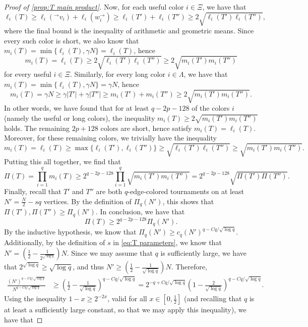 \documentclass[11pt,reqno]{amsart}
\theoremstyle{definition}
\newcommand\ab[1]{\lvert#1\rvert}
\newcommand\1{\mathbf{1}}
\let\geq\geqslant
\begin{document}
\begin{proof}[Proof of \cref{prop:T main product}]
    Now, for each useful color $i \in \Xi$, we have that
    \[
        \ell_i(T) \geq \ell_i(^\to v_i)+\ell_i(w_i^\to) \geq \ell_i(T')+\ell_i(T'') \geq 2\sqrt{\ell_i(T') \ell_i(T'')},
    \]
    where the final bound is the inequality of arithmetic and geometric means. Since every such color is short, we also know that $m_i(T)=\min\{\ell_i(T),\gamma N\}=\ell_i(T)$, hence
    \[
        m_i(T)=\ell_i(T)\geq 2 \sqrt{\ell_i(T')\ell_i(T'')}\geq 2\sqrt{m_i(T')m_i(T'')}
    \]
    for every useful $i \in \Xi$.
    Similarly, for every long color $i \in \Lambda$, we have that $m_i(T)=\min\{\ell_i(T),\gamma N\}=\gamma N$, hence
    \[
        m_i(T) = \gamma N \geq \gamma \ab{T'}+\gamma \ab{T''} \geq m_i(T')+m_i(T'') \geq 2\sqrt{m_i(T')m_i(T'')}.
    \]
    In other words, we have found that for at least $q-2p-128$ of the colors $i$ (namely the useful or long colors), the inequality $m_i(T) \geq 2 \sqrt{m_i(T')m_i(T'')}$ holds. The remaining $2p+128$ colors are short, hence satisfy $m_i(T)=\ell_i(T)$. Moreover, for these remaining colors, we trivially have the inequality
    \[
        m_i(T)=\ell_i(T) \geq \max\{\ell_i(T'),\ell_i(T'')\} \geq \sqrt{\ell_i(T')\ell_i(T'')}\geq \sqrt{m_i(T')m_i(T'')}.
    \]
    Putting this all together, we find that
    \[
        \Pi(T) = \prod_{i=1}^q m_i(T) \geq 2^{q-2p-128} \prod_{i=1}^q\sqrt{m_i(T')m_i(T'')} = 2^{q-2p-128} \sqrt{\Pi(T')\Pi(T'')}.
    \]
    Finally, recall that $T'$ and $T''$ are both $q$-edge-colored tournaments on at least $N'=\frac N2-sq$ vertices. By the definition of $\Pi_q(N')$, this shows that $\Pi(T'), \Pi(T'') \geq \Pi_q(N')$. In conclusion, we have that
    \[
        \Pi(T) \geq 2^{q-2p-128} \Pi_q(N').
    \]
    By the inductive hypothesis, we know that $\Pi_q(N')\geq c_q (N')^{q-Cq/\sqrt{\log q}}$.
    Additionally, by the definition of $s$ in \eqref{eq:T parameters}, we know that $N' = (\frac 12-\frac{1}{2^{\sqrt{\log q}}})N$. Since we may assume that $q$ is sufficiently large, we have that $2^{\sqrt{\log q}}\geq \sqrt{\log q}$, and thus $N'\geq (\frac 12-\frac{1}{{\sqrt{\log q}}})N$.  Therefore,
    \begin{align*}
        \frac{(N')^{q-Cq/\sqrt{\log q}}}{N^{q-Cq/\sqrt{\log q}}} &\geq \left( \frac 12-\frac{1}{{\sqrt{\log q}}} \right)^{q-Cq/\sqrt{\log q}} = 2^{-q+Cq/\sqrt{\log q}} \left( 1-\frac{2}{{\sqrt{\log q}}} \right)^{q-Cq/\sqrt{\log q}}.
    \end{align*}
    Using the inequality $1-x \geq 2^{-2x}$, valid for all $x \in [0,\frac 12]$ (and recalling that $q$ is at least a sufficiently large constant, so that we may apply this inequality), we have that

\end{proof}
\end{document}
